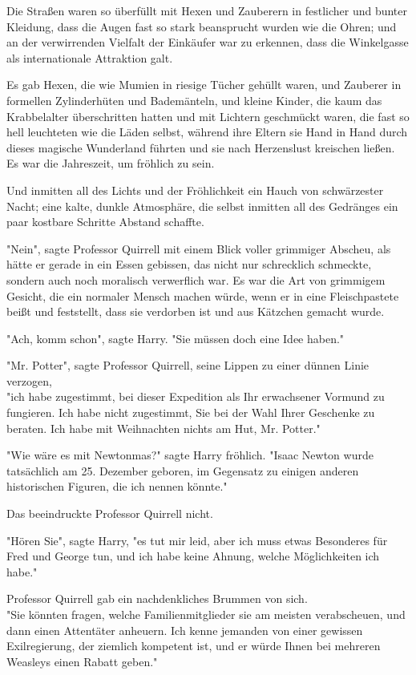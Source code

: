 {Die Straßen waren so überfüllt mit Hexen und Zauberern in festlicher und bunter Kleidung, dass die Augen fast so stark beansprucht wurden wie die Ohren; und an der verwirrenden Vielfalt der Einkäufer war zu erkennen, dass die Winkelgasse als internationale Attraktion galt.

Es gab Hexen, die wie Mumien in riesige Tücher gehüllt waren, und Zauberer in formellen Zylinderhüten und Bademänteln, und kleine Kinder, die kaum das Krabbelalter überschritten hatten und mit Lichtern geschmückt waren, die fast so hell leuchteten wie die Läden selbst, während ihre Eltern sie Hand in Hand durch dieses magische Wunderland führten und sie nach Herzenslust kreischen ließen.\\ Es war die Jahreszeit, um fröhlich zu sein.

Und inmitten all des Lichts und der Fröhlichkeit ein Hauch von schwärzester Nacht; eine kalte, dunkle Atmosphäre, die selbst inmitten all des Gedränges ein paar kostbare Schritte Abstand schaffte.

"Nein", sagte Professor Quirrell mit einem Blick voller grimmiger Abscheu, als hätte er gerade in ein Essen gebissen, das nicht nur schrecklich schmeckte, sondern auch noch moralisch verwerflich war. Es war die Art von grimmigem Gesicht, die ein normaler Mensch machen würde, wenn er in eine Fleischpastete beißt und feststellt, dass sie verdorben ist und aus Kätzchen gemacht wurde.

"Ach, komm schon", sagte Harry. "Sie müssen doch eine Idee haben."

"Mr. Potter", sagte Professor Quirrell, seine Lippen zu einer dünnen Linie verzogen,\\ "ich habe zugestimmt, bei dieser Expedition als Ihr erwachsener Vormund zu fungieren. Ich habe nicht zugestimmt, Sie bei der Wahl Ihrer Geschenke zu beraten. Ich habe mit Weihnachten nichts am Hut, Mr. Potter."

"Wie wäre es mit Newtonmas?" sagte Harry fröhlich. "Isaac Newton wurde tatsächlich am 25. Dezember geboren, im Gegensatz zu einigen anderen historischen Figuren, die ich nennen könnte."

Das beeindruckte Professor Quirrell nicht.

"Hören Sie", sagte Harry, "es tut mir leid, aber ich muss etwas Besonderes für Fred und George tun, und ich habe keine Ahnung, welche Möglichkeiten ich habe."

Professor Quirrell gab ein nachdenkliches Brummen von sich.\\ "Sie könnten fragen, welche Familienmitglieder sie am meisten verabscheuen, und dann einen Attentäter anheuern. Ich kenne jemanden von einer gewissen Exilregierung, der ziemlich kompetent ist, und er würde Ihnen bei mehreren Weasleys einen Rabatt geben."

}
